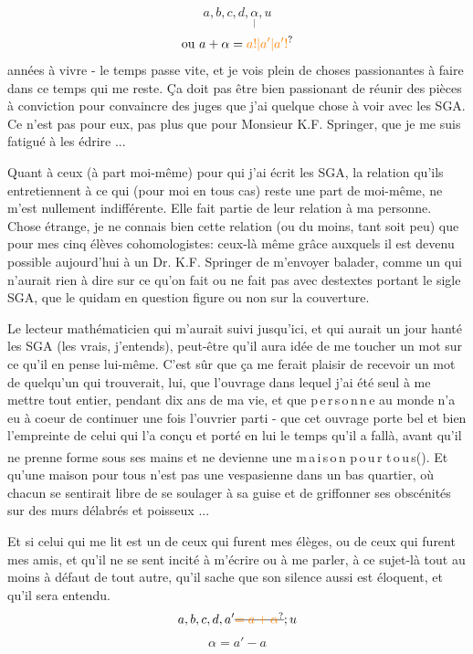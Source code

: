 \[
a,b,c,d,\underset{\big|}{\alpha},u
\]
\[
\text{ou }a+\alpha=\unsure{a!|a'|a'!}
\]
années à vivre - le temps passe vite, et je vois plein de choses passionantes à faire dans ce temps qui me reste. Ça  doit pas être bien passionant de réunir des pièces à conviction pour convaincre des juges que j'ai quelque chose à voir avec les SGA. Ce n'est pas pour eux, pas plus que pour Monsieur K.F. Springer, que je me suis fatigué à les édrire ...

Quant à ceux (à part moi-même) pour qui j'ai écrit les SGA, la relation qu'ils entretiennent à ce qui (pour moi en tous cas) reste une part de moi-même, ne m'est nullement indifférente. Elle fait partie de leur relation à ma personne. Chose étrange, je ne connais bien cette relation (ou du moins, tant soit peu) que pour mes cinq élèves cohomologistes: ceux-là même grâce auxquels il est devenu possible aujourd'hui  à un Dr. K.F. Springer de m'envoyer balader, comme un  qui n'aurait rien à dire sur ce qu'on fait ou ne fait pas avec des\handwritten{\(\vert\)}textes portant le sigle SGA, que le quidam en question figure ou non sur la couverture.

Le lecteur mathématicien qui m'aurait suivi jusqu'ici, et qui aurait un jour hanté les SGA (les vrais, j'entends), peut-être qu'il aura idée de me toucher un mot sur ce qu'il en pense lui-même. C'est sûr que ça me ferait plaisir de recevoir un mot de quelqu'un qui trouverait, lui, que l'ouvrage dans lequel j'ai été seul à me mettre tout entier, pendant dix ans de ma vie, et que \mbox{p\,e\,r\,s\,o\,n\,n\,e} au monde n'a eu à coeur de continuer une fois l'ouvrier parti - que cet ouvrage porte bel et bien l'empreinte de celui qui l'a conçu et porté en lui le temps qu'il a fallà, avant qu'il ne prenne forme sous ses mains et ne devienne une \mbox{m\,a\,i\,s\,o\,n} \mbox{p\,o\,u\,r} \mbox{t\,o\,u\,s}(\textsuperscript{}). Et qu'une maison pour tous n'est pas une vespasienne dans un bas quartier, où chacun se sentirait libre de se soulager à sa guise et de griffonner ses obscénités sur des murs délabrés et poisseux ...

Et si celui qui me lit est un de ceux qui furent mes élèges, ou  de ceux qui furent mes amis, et qu'il ne se sent incité à m'écrire ou à me parler, à ce sujet-là tout au moins à défaut de tout autre, qu'il sache que son silence aussi est éloquent, et qu'il sera entendu.
\[
a,b,c,d,a'\deleted{\unsure{=a+\alpha}};u
\]
\[
\alpha=a'-a
\]

